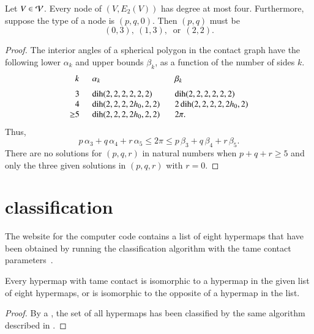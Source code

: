 \documentclass{llncs}
\def\op#1{{\hbox{#1}}}
\begin{document}
\begin{lemma}\label{lemma:no-5} 
  Let $V\in {\mathcal V}$.  Every node of $(V,E_2(V))$ has degree at most
  four.  Furthermore, suppose the type of a node is $(p,q,0)$.  Then
  $(p,q)$ must be
\[
(0,3),~(1,3),~\text{ or}~~(2,2).
\]
\end{lemma}

\begin{proof} The interior angles of a spherical polygon in the
  contact graph have the following lower $\alpha_k$ and upper bounds
  $\beta_k$, as a function of the number of sides $k$.
\begin{equation}
\begin{array}{lllll}
  \phantom{\ge}k~~&\alpha_k & \beta_k \vspace{6pt}\\
  \phantom{\ge}3~~&\op{dih}(2,2,2,2,2,2)  &\op{dih}(2,2,2,2,2,2)\\
  \phantom{\ge}4~~&\op{dih}(2,2,2,2h_0,2,2) &2\,\op{dih}(2,2,2,2,2h_0,2)\\
  {\ge}5~~& \op{dih}(2,2,2,2h_0,2,2) ~~~& 2\pi.
\end{array}
\end{equation}
Thus,
\[
  p\,\alpha_3 + q\,\alpha_4 +r\, \alpha_5 
\le 2\pi \le p\,\beta_3 + q\,\beta_4 + r \,\beta_5.
\]
There are no solutions for
$(p,q,r)$ in natural numbers when $p+q+r\ge 5$ and
 only the three given solutions in $(p,q,r)$ with $r=0$.
\end{proof}



\section{classification}

The website for the computer code  contains a list of eight hypermaps
that have been obtained by running the classification algorithm with
the tame contact parameters~\cite{website:FlyspeckProject}.

\begin{lemma}\cutrate{}
  \label{lemma:contact-classification} Every hypermap with tame
  contact is isomorphic to a hypermap in the given list of eight
  hypermaps, or is isomorphic to the opposite of a hypermap in the
  list.  %
\end{lemma}

\begin{proof}
  By a , %
 the set of all hypermaps has been classified by the same
  algorithm described in \cite[Chapter~4]{DSP}.
\end{proof}
\end{document}
